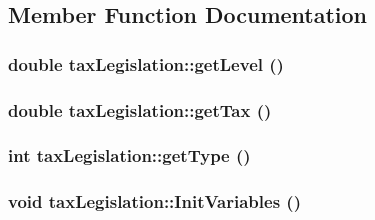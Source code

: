 \subsection{Member Function Documentation}
\hypertarget{classtax_legislation_ae5d6de8995fc279d67c8a99ab669f839}{
\subsubsection[{getLevel}]{\setlength{\rightskip}{0pt plus 5cm}double taxLegislation::getLevel ()}}
\label{classtax_legislation_ae5d6de8995fc279d67c8a99ab669f839}
\hypertarget{classtax_legislation_a4996538fc577797ff1774d716fcb65d9}{
\subsubsection[{getTax}]{\setlength{\rightskip}{0pt plus 5cm}double taxLegislation::getTax ()}}
\label{classtax_legislation_a4996538fc577797ff1774d716fcb65d9}
\hypertarget{classtax_legislation_ad4433eef048eef886850174f7d799ae5}{
\subsubsection[{getType}]{\setlength{\rightskip}{0pt plus 5cm}int taxLegislation::getType ()}}
\label{classtax_legislation_ad4433eef048eef886850174f7d799ae5}
\hypertarget{classtax_legislation_a7779a3f675f559f66cbfaf62f73bf746}{
\subsubsection[{InitVariables}]{\setlength{\rightskip}{0pt plus 5cm}void taxLegislation::InitVariables ()}}
\label{classtax_legislation_a7779a3f675f559f66cbfaf62f73bf746}


